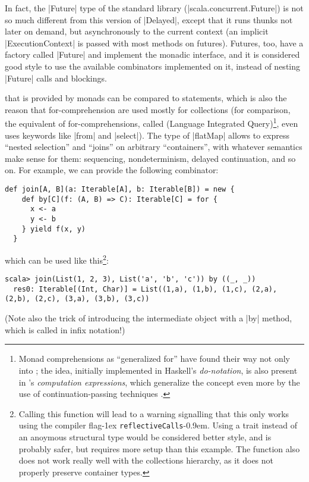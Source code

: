 In fact, the |Future| type of the standard library (|scala.concurrent.Future|) is not so much
different from this version of |Delayed|, except that it runs thunks not later on demand, but
asynchronously to the current context (an implicit |ExecutionContext| is passed with most methods on
futures). Futures, too, have a factory called |Future| and implement the monadic interface, and it
is considered good style to use the available combinators implemented on it, instead of nesting
|Future| calls and blockings.

 that is provided by monads can be compared to 
statements, which is also the reason that for-comprehension are used mostly for collections (for
comparison, the \csharp{} equivalent of for-comprehensions, called  (Language
Integrated Query)\footnote{Monad comprehensions as \enquote{generalized for} have found their way
  not only into \csharp; the idea, initially implemented in Haskell's \emph{do-notation}, is also
  present in \fsharp's \emph{computation expressions}, which generalize the concept even more by the
use of continuation-passing techniques \cite[][p.~62]{syme2012:fsharp}.},
even uses  keywords like |from| and |select|). The type of |flatMap| allows to express
\enquote{nested selection} and \enquote{joins} on arbitrary \enquote{containers}, with whatever
semantics make sense for them: sequencing, nondeterminism, delayed continuation, and so on. For
example, we can provide the following combinator:
\begin{lstlisting}[label=lst:join]
  def join[A, B](a: Iterable[A], b: Iterable[B]) = new {
    def by[C](f: (A, B) => C): Iterable[C] = for {
      x <- a
      y <- b
    } yield f(x, y)
  }
\end{lstlisting}
which can be used like this\footnote{Calling this function will lead to a warning signalling that
  this only works using the compiler flag\kern-1ex \lstinline|reflectiveCalls|\kern-0.9em. Using a
  trait instead of an anoymous structural type would be considered better style, and is probably
  safer, but requires more setup than this example. The function also does not work really well with
  the collections hierarchy, as it does not properly preserve container types.}:
\begin{lstlisting}[style=break-lines]
  scala> join(List(1, 2, 3), List('a', 'b', 'c')) by ((_, _))
  res0: Iterable[(Int, Char)] = List((1,a), (1,b), (1,c), (2,a), (2,b), (2,c), (3,a), (3,b), (3,c))
\end{lstlisting}
(Note also the trick of introducing the intermediate object with a |by| method, which is called in
infix notation!)

